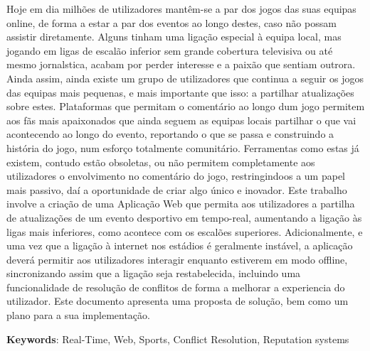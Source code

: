 Hoje em dia milhões de utilizadores mantêm-se a par dos jogos das suas equipas online, de forma a estar a par dos eventos ao longo destes, caso não possam assistir diretamente. Alguns tinham uma ligação especial à equipa local, mas jogando em ligas de escalão inferior sem grande cobertura televisiva ou até mesmo jornalstica, acabam por perder interesse e a paixão que sentiam outrora. Ainda assim, ainda existe um grupo de utilizadores que continua a seguir os jogos das equipas mais pequenas, e mais importante que isso: a partilhar atualizações sobre estes. Plataformas que permitam o comentário ao longo dum jogo permitem aos fãs mais apaixonados que ainda seguem as equipas locais partilhar o que vai acontecendo ao longo do evento, reportando o que se passa e construindo a história do jogo, num esforço totalmente comunitário. Ferramentas como estas já existem, contudo estão obsoletas, ou não permitem completamente aos utilizadores o envolvimento no comentário do jogo, restringindoos a um papel mais passivo, daí a oportunidade de criar algo único e inovador. Este trabalho involve a criação de uma Aplicação Web que permita aos utilizadores a partilha de atualizações de um evento desportivo em tempo-real, aumentando a ligação às ligas mais inferiores, como acontece com os escalões superiores. Adicionalmente, e uma vez que a ligação à internet nos estádios é geralmente instável, a aplicação deverá permitir aos utilizadores interagir enquanto estiverem em modo offline, sincronizando assim que a ligação seja restabelecida, incluindo uma funcionalidade de resolução de conflitos de forma a melhorar a experiencia do utilizador. Este documento apresenta uma proposta de solução, bem como um plano para a sua implementação.


\vspace*{10mm}\noindent
\textbf{Keywords}: Real-Time, Web, Sports, Conflict Resolution, Reputation systems
